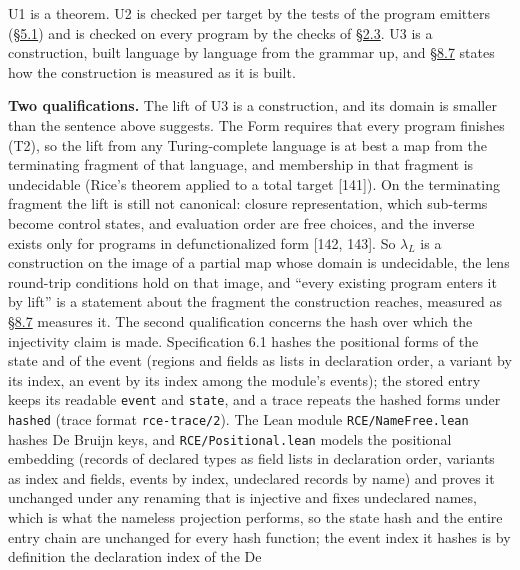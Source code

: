 \documentclass[10pt,letterpaper]{article}
\begin{document}
U1 is a theorem. U2 is checked per target by the tests of the program
emitters
(\href{https://research.openie.dev/papers/rce/\#51-differential-testing-of-the-program-emitters}{§5.1})
and is checked on every program by the checks of
\href{https://research.openie.dev/papers/rce/\#23-the-ecosystem-checked-per-program}{§2.3}.
U3 is a construction, built language by language from the grammar up,
and
\href{https://research.openie.dev/papers/rce/\#87-lift-coverage-across-languages}{§8.7}
states how the construction is measured as it is built.

\textbf{Two qualifications.} The lift of U3 is a construction, and its
domain is smaller than the sentence above suggests. The Form requires
that every program finishes (T2), so the lift from any Turing-complete
language is at best a map from the terminating fragment of that
language, and membership in that fragment is undecidable (Rice's theorem
applied to a total target {[}141{]}). On the terminating fragment the
lift is still not canonical: closure representation, which sub-terms
become control states, and evaluation order are free choices, and the
inverse exists only for programs in defunctionalized form {[}142,
143{]}. So \(\lambda_L\) is a construction on the image of a partial map
whose domain is undecidable, the lens round-trip conditions hold on that
image, and ``every existing program enters it by lift'' is a statement
about the fragment the construction reaches, measured as
\href{https://research.openie.dev/papers/rce/\#87-lift-coverage-across-languages}{§8.7}
measures it. The second qualification concerns the hash over which the
injectivity claim is made. Specification 6.1 hashes the positional forms
of the state and of the event (regions and fields as lists in
declaration order, a variant by its index, an event by its index among
the module's events); the stored entry keeps its readable \texttt{event}
and \texttt{state}, and a trace repeats the hashed forms under
\texttt{hashed} (trace format \texttt{rce-trace/2}). The Lean module
\texttt{RCE/\allowbreak{}NameFree.\allowbreak{}lean} hashes De Bruijn keys, and
\texttt{RCE/\allowbreak{}Positional.\allowbreak{}lean} models the positional embedding (records of
declared types as field lists in declaration order, variants as index
and fields, events by index, undeclared records by name) and proves it
unchanged under any renaming that is injective and fixes undeclared
names, which is what the nameless projection performs, so the state hash
and the entire entry chain are unchanged for every hash function; the
event index it hashes is by definition the declaration index of the De
\end{document}
